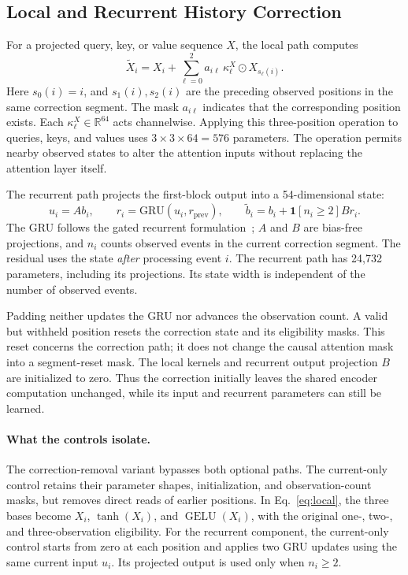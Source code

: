 \documentclass[runningheads]{llncs}
\newcommand{\GELU}{\operatorname{GELU}}
\begin{document}
\subsection{Local and Recurrent History Correction}
For a projected query, key, or value sequence $X$, the local path computes
\begin{equation}
 \widetilde X_i=X_i+\sum_{\ell=0}^{2}a_{i\ell}\,\kappa^X_\ell\odot X_{s_\ell(i)}.
 \label{eq:local}
\end{equation}
Here $s_0(i)=i$, and $s_1(i),s_2(i)$ are the preceding observed positions in the same correction segment. The mask $a_{i\ell}$ indicates that the corresponding position exists. Each $\kappa^X_\ell\in\mathbb{R}^{64}$ acts channelwise. Applying this three-position operation to queries, keys, and values uses $3\times3\times64=576$ parameters. The operation permits nearby observed states to alter the attention inputs without replacing the attention layer itself.

The recurrent path projects the first-block output into a 54-dimensional state:
\begin{equation}
 u_i=A b_i,\qquad r_i=\mathrm{GRU}(u_i,r_{\mathrm{prev}}),\qquad
 \widetilde b_i=b_i+\mathbf{1}[n_i\geq2]B r_i.
 \label{eq:recurrent}
\end{equation}
The GRU follows the gated recurrent formulation~\cite{cho2014gru}; $A$ and $B$ are bias-free projections, and $n_i$ counts observed events in the current correction segment. The residual uses the state \emph{after} processing event $i$. The recurrent path has 24,732 parameters, including its projections. Its state width is independent of the number of observed events.

Padding neither updates the GRU nor advances the observation count. A valid but withheld position resets the correction state and its eligibility masks. This reset concerns the correction path; it does not change the causal attention mask into a segment-reset mask. The local kernels and recurrent output projection $B$ are initialized to zero. Thus the correction initially leaves the shared encoder computation unchanged, while its input and recurrent parameters can still be learned.

\paragraph{What the controls isolate.}
The correction-removal variant bypasses both optional paths. The current-only control retains their parameter shapes, initialization, and observation-count masks, but removes direct reads of earlier positions. In Eq.~\eqref{eq:local}, the three bases become $X_i$, $\tanh(X_i)$, and $\GELU(X_i)$, with the original one-, two-, and three-observation eligibility. For the recurrent component, the current-only control starts from zero at each position and applies two GRU updates using the same current input $u_i$. Its projected output is used only when $n_i\geq2$.
\end{document}
